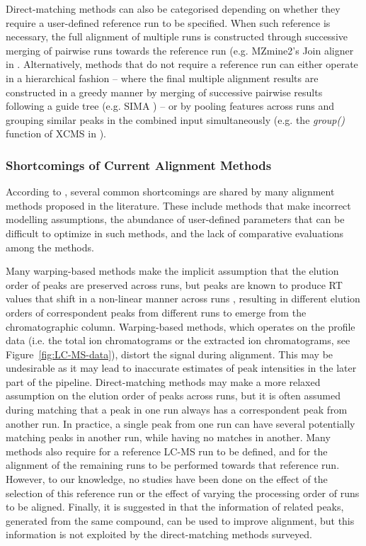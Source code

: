 Direct-matching methods can also be categorised depending on whether they require a user-defined reference run to be specified. When such reference is necessary, the full alignment of multiple runs is constructed through successive merging of pairwise runs towards the reference run (e.g. MZmine2's Join aligner in \cite{Pluskal2010}. Alternatively, methods that do not require a reference run can either operate in a hierarchical fashion -- where the final multiple alignment results are constructed in a greedy manner by merging of successive pairwise results following a guide tree (e.g. SIMA \cite{Voss2011a}) -- or by pooling features across runs and grouping similar peaks in the combined input simultaneously (e.g. the \textit{group()} function of XCMS in \cite{Smith2006}).

\subsubsection{Shortcomings of Current Alignment Methods\label{sub:limitation-in-current-methods}}

According to \cite{Smith2013}, several common shortcomings are shared by many alignment methods proposed in the literature. These include methods that make incorrect modelling assumptions, the abundance of user-defined parameters that can be difficult to optimize in such methods, and the lack of comparative evaluations among the methods. 

Many warping-based methods make the implicit assumption that the elution order of peaks are preserved across runs, but peaks are known to produce RT values that shift in a non-linear manner across runs \cite{Podwojski2009}, resulting in different elution orders of correspondent peaks from different runs to emerge from the chromatographic column. Warping-based methods, which operates on the profile data (i.e. the total ion chromatograms or the extracted ion chromatograms, see Figure~\ref{fig:LC-MS-data}), distort the signal during alignment. This may be undesirable as it may lead to inaccurate estimates of peak intensities in the later part of the pipeline. Direct-matching methods may make a more relaxed assumption on the elution order of peaks across runs, but it is often assumed during matching that a peak in one run always has a correspondent peak from another run. In practice, a single peak from one run can have several potentially matching peaks in another run, while having no matches in another. Many methods also require for a reference LC-MS run to be defined, and for the alignment of the remaining runs to be performed towards that reference run. However, to our knowledge, no studies have been done on the effect of the selection of this reference run or the effect of varying the processing order of runs to be aligned. Finally, it is suggested in \cite{Smith2015} that the information of related peaks, generated from the same compound, can be used to improve alignment, but this information is not exploited by the direct-matching methods surveyed. 


